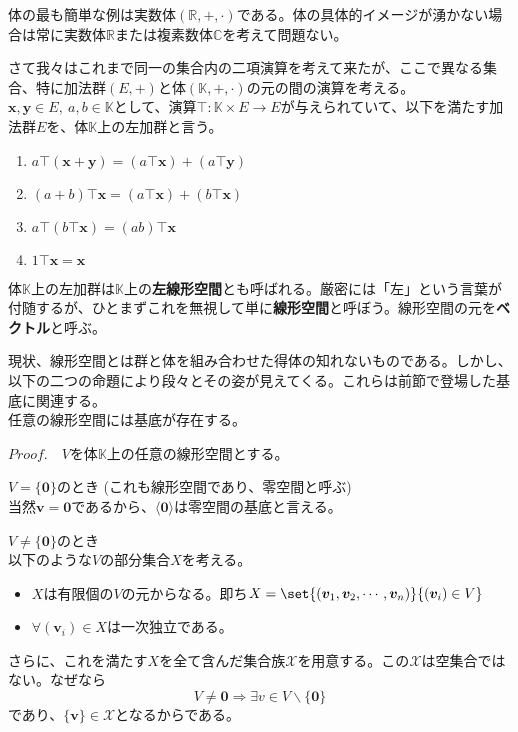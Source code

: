 \documentclass[dvipdfmx]{jsarticle}
\begin{document}
体の最も簡単な例は実数体$(\mathbb{R},+,\cdot)$である。体の具体的イメージが湧かない場合は常に実数体$\mathbb{R}$または複素数体$\mathbb{C}$を考えて問題ない。\par
さて我々はこれまで同一の集合内の二項演算を考えて来たが、ここで異なる集合、特に加法群$(E,+)$と体$(\mathbb{K},+,\cdot)$の元の間の演算を考える。$\bm{x},\bm{y} \in E,~a,b \in \mathbb{K}$として、演算$\top:\mathbb{K} \times E \to E$が与えられていて、以下を満たす加法群$E$を、体$\mathbb{K}$上の左加群と言う。
\begin{enumerate}
\item $a \top (\bm{x} + \bm{y}) = (a \top \bm{x})+(a \top \bm{y})$
\item $(a+b) \top \bm{x} = (a \top \bm{x})+(b \top \bm{x})$
\item $a \top (b \top \bm{x}) = (ab) \top \bm{x}$
\item $1 \top \bm{x} = \bm{x}$
\end{enumerate}
体$\mathbb{K}$上の左加群は$\mathbb{K}$上の\textbf{左線形空間}とも呼ばれる。厳密には「左」という言葉が付随するが、ひとまずこれを無視して単に\textbf{線形空間}と呼ぼう。線形空間の元を\textbf{ベクトル}と呼ぶ。\par
現状、線形空間とは群と体を組み合わせた得体の知れないものである。しかし、以下の二つの命題により段々とその姿が見えてくる。これらは前節で登場した基底に関連する。\\
任意の線形空間には基底が存在する。\\\par
$Proof.$　$V$を体$\mathbb{K}$上の任意の線形空間とする。\\\par
$V=\{\bm{0}\}$のとき (これも線形空間であり、零空間と呼ぶ)\\
当然$\bm{v}=\bm{0}$であるから、$\langle\bm{0}\rangle$は零空間の基底と言える。\\\par
$V\neq\{\bm{0}\}$のとき\\
以下のような$V$の部分集合$X$を考える。
\begin{itemize}
\item $X$は有限個の$V$の元からなる。即ち$X=\set{(\bm{v}_1,\bm{v}_2,\cdots,\bm{v}_n)}{(\bm{v}_i) \in V}$
\item $\forall(\bm{v}_i) \in X$は一次独立である。
\end{itemize}
さらに、これを満たす$X$を全て含んだ集合族$\mathscr{X}$を用意する。この$\mathscr{X}$は空集合ではない。なぜなら
\[V\neq\bm{0}\Rightarrow\exists v \in V\backslash\{\bm{0}\}\]
であり、$\{\bm{v}\}\in\mathscr{X}$となるからである。\par
\end{document}
